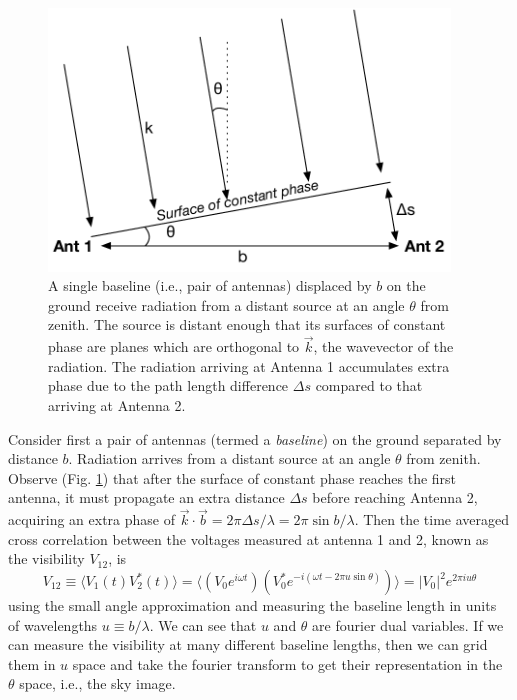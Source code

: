 {\begin{figure}[h]
    \centering
    \includegraphics[width=0.95\textwidth]{chap0_intro/radio_interferometer_diagram.pdf}
    \caption[Diagram of a two element radio interferometer]{A single baseline (i.e., pair of antennas) displaced by $b$ on the ground receive radiation from a distant source at an angle $\theta$ from zenith. The source is distant enough that its surfaces of constant phase are planes which are orthogonal to $\vec{k}$, the wavevector of the radiation. The radiation arriving at Antenna 1 accumulates extra phase due to the path length difference $\Delta s$ compared to that arriving at Antenna 2.}
    \label{fig:radiointerferometerdiagram}
\end{figure}

Consider first a pair of antennas (termed a \textit{baseline}) on the ground separated by distance $b$. Radiation arrives from a distant source at an angle $\theta$ from zenith. Observe (Fig. \ref{fig:radiointerferometerdiagram}) that after the surface of constant phase reaches the first antenna, it must propagate an extra distance $\Delta s$ before reaching Antenna 2, acquiring an extra phase of $\vec{k}\cdot \vec{b}=2\pi\Delta s/\lambda=2\pi\sin b/\lambda$. Then the time averaged cross correlation between the voltages measured at antenna 1 and 2, known as the visibility $V_{12}$, is
\begin{equation}
\label{eqn:vis1D}
	V_{12}\equiv\langle V_1(t)V_2^*(t)\rangle=\langle(V_0 e^{i\omega t})(V_0^*e^{-i(\omega t-2\pi u\sin \theta)})\rangle = |V_0|^2 e^{2\pi i u\theta}
\end{equation}
using the small angle approximation and measuring the baseline length in units of wavelengths $u\equiv b/\lambda$. We can see that $u$ and $\theta$ are fourier dual variables. If we can measure the visibility at many different baseline lengths, then we can grid them in $u$ space and take the fourier transform to get their representation in the $\theta$ space, i.e., the sky image.

}
